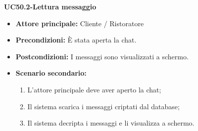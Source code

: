 \textbf{UC50.2-Lettura messaggio}
\begin{itemize}
\item \textbf{Attore principale:} Cliente / Ristoratore
\item \textbf{Precondizioni:} È stata aperta la chat.
\item \textbf{Postcondizioni:} I messaggi sono visualizzati a schermo.
\item \textbf{Scenario secondario:}
\begin{enumerate}
    \item L'attore principale deve aver aperto la chat;
    \item Il sistema scarica i messaggi criptati dal database;
    \item Il sistema decripta i messaggi e li visualizza a schermo.
\end{enumerate}
\end{itemize}
